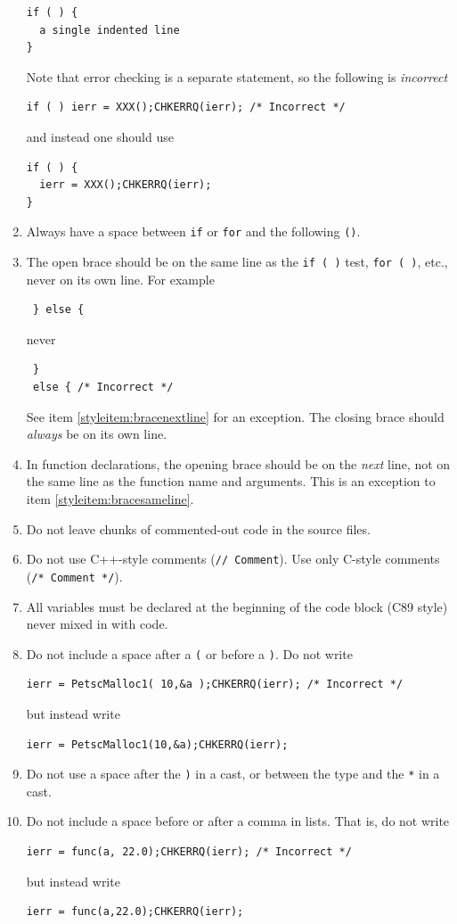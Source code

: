 \begin{enumerate}
\begin{lstlisting}
if ( ) {
  a single indented line
}
\end{lstlisting}
Note that error checking is a separate statement, so the following is {\em incorrect}
\begin{lstlisting}
if ( ) ierr = XXX();CHKERRQ(ierr); /* Incorrect */
\end{lstlisting}
and instead one should use
\begin{lstlisting}
if ( ) {
  ierr = XXX();CHKERRQ(ierr);
}
\end{lstlisting}
\item Always have a space between \lstinline{if} or \lstinline{for} and the following \lstinline{()}.
\item \label{styleitem:bracesameline} The open brace should be on the same line as the \lstinline{if ( )} test, \lstinline{for ( )}, etc., never on its own line.  For example
\begin{lstlisting}
 } else {
\end{lstlisting}
never
\begin{lstlisting}
 }
 else { /* Incorrect */
\end{lstlisting}
See item \ref{styleitem:bracenextline} for an exception.
 The closing brace should {\em always} be on its own line.
\item \label{styleitem:bracenextline} In function declarations, the opening brace should be on the {\em next} line, not on the same line as the function name and arguments.
  This is an exception to item \ref{styleitem:bracesameline}.
\item Do not leave chunks of commented-out code in the source files.
\item Do not use C++-style comments (\lstinline{// Comment}). Use only C-style comments (\lstinline{/* Comment */}).
\item All variables must be declared at the beginning of the code block (C89 style) never mixed in with code.
\item Do not include a space after a \lstinline{(} or before a \lstinline{)}. Do not write
\begin{lstlisting}
ierr = PetscMalloc1( 10,&a );CHKERRQ(ierr); /* Incorrect */
\end{lstlisting}
but instead write
\begin{lstlisting}
ierr = PetscMalloc1(10,&a);CHKERRQ(ierr);
\end{lstlisting}
\item Do not use a space after the \lstinline{)} in a cast, or between the type and the \lstinline{*} in a cast.
\item Do not include a  space before or after a comma in lists.
That is, do not write
\begin{lstlisting}
ierr = func(a, 22.0);CHKERRQ(ierr); /* Incorrect */
\end{lstlisting}
but instead write
\begin{lstlisting}
ierr = func(a,22.0);CHKERRQ(ierr);
\end{lstlisting}
\end{enumerate}

